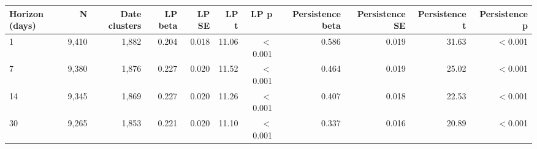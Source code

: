 \begin{tabular}{lrrrrrrrrrr}
\toprule
Horizon (days) & N & Date clusters & LP beta & LP SE & LP t & LP p & Persistence beta & Persistence SE & Persistence t & Persistence p \\
\midrule
1 & 9,410 & 1,882 & 0.204 & 0.018 & 11.06 & \ensuremath{<}0.001 & 0.586 & 0.019 & 31.63 & \ensuremath{<}0.001 \\
7 & 9,380 & 1,876 & 0.227 & 0.020 & 11.52 & \ensuremath{<}0.001 & 0.464 & 0.019 & 25.02 & \ensuremath{<}0.001 \\
14 & 9,345 & 1,869 & 0.227 & 0.020 & 11.26 & \ensuremath{<}0.001 & 0.407 & 0.018 & 22.53 & \ensuremath{<}0.001 \\
30 & 9,265 & 1,853 & 0.221 & 0.020 & 11.10 & \ensuremath{<}0.001 & 0.337 & 0.016 & 20.89 & \ensuremath{<}0.001 \\
\bottomrule
\end{tabular}
